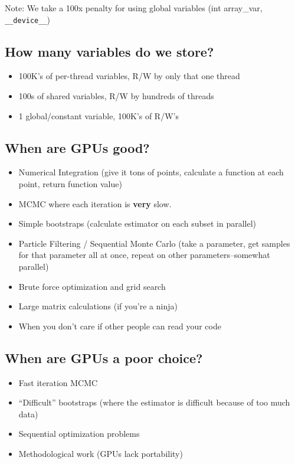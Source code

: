 \documentclass[12pt]{article}
\begin{document}
Note: We take a 100x penalty for using global variables (int array\_var,
\texttt{\_\_device\_\_})

\subsection{How many variables do we
store?}\label{how-many-variables-do-we-store}

\begin{itemize}
\itemsep1pt\parskip0pt
\item
  100K's of per-thread variables, R/W by only that one thread
\item
  100s of shared variables, R/W by hundreds of threads
\item
  1 global/constant variable, 100K's of R/W's
\end{itemize}

\subsection{When are GPUs good?}\label{when-are-gpus-good}

\begin{itemize}
\itemsep1pt\parskip0pt
\item
  Numerical Integration (give it tons of points, calculate a function at
  each point, return function value)
\item
  MCMC where each iteration is \textbf{very} slow.
\item
  Simple bootstraps (calculate estimator on each subset in parallel)
\item
  Particle Filtering / Sequential Monte Carlo (take a parameter, get
  samples for that parameter all at once, repeat on other
  parameters--somewhat parallel)
\item
  Brute force optimization and grid search
\item
  Large matrix calculations (if you're a ninja)
\item
  When you don't care if other people can read your code
\end{itemize}

\subsection{When are GPUs a poor choice?}
\begin{itemize}
\itemsep1pt\parskip0pt
\item Fast iteration MCMC
\item ``Difficult'' bootstraps (where the estimator is difficult because of too much data)
\item Sequential optimization problems
\item Methodological work (GPUs lack portability)
\end{itemize}
\end{document}
